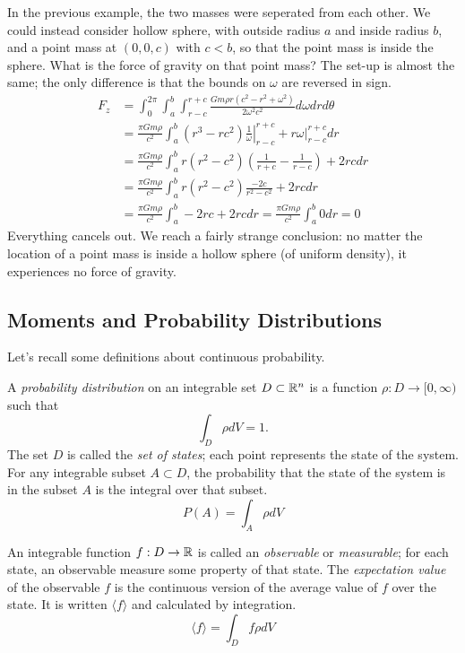 \documentclass[fleqn,letterpaper]{report}
\begin{document}
In the previous example, the two masses were seperated from
each other. We could instead consider hollow sphere, with outside radius
$a$ and inside radius $b$, and a point mass at $(0,0,c)$ with
$c<b$, so that the point mass is inside the sphere. What is
the force of gravity on that point mass? The set-up is 
almost the same; the only difference is that the bounds on
$\omega$ are reversed in sign.
\begin{align*}
F_z & = \int_0^{2\pi} \int_a^b \int_{r-c}^{r+c} \frac{Gm\rho r
(c^2 -r^2 + \omega^2)}{2\omega^2 c^2} d\omega dr d\theta \\
& = \frac{\pi G m \rho}{c^2} \int_a^b \left. (r^3-rc^2)
\frac{1}{\omega} \right|_{r-c}^{r+c} + r\omega
\bigg|_{r-c}^{r+c} dr \\
& = \frac{\pi G m \rho}{c^2} \int_a^b r(r^2 -c^2) \left(
\frac{1}{r+c} - \frac{1}{r-c} \right) + 2rc dr \\
& = \frac{\pi G m \rho}{c^2} \int_a^b r(r^2 -c^2)
\frac{-2c}{r^2-c^2} + 2rc dr \\
& = \frac{\pi G m \rho}{c^2} \int_a^b -2rc + 2rc dr =
\frac{\pi G m \rho}{c^2} \int_a^b 0 dr = 0
\end{align*}
Everything cancels out. We reach a fairly strange conclusion:
no matter the location of a point mass is inside a hollow
sphere (of uniform density), it experiences no force of
gravity.

\subsection{Moments and Probability Distributions}
\label{moments}

Let's recall some definitions about continuous probability. 

\begin{defn}
A \emph{probability distribution} on an integrable set $D
\subset \mathbb{R}^n$ is a function $\rho: D \rightarrow [0, \infty)$
such that 
\begin{equation*}
\int_D \rho dV = 1.
\end{equation*}
The set $D$ is called the \emph{set of states}; each point represents
the state of the system. For any integrable subset $A \subset D$, the
probability that the state of the system is in the subset $A$
is the integral over that subset.
\begin{equation*}
P(A) = \int_A \rho dV 
\end{equation*}
\end{defn}

\begin{defn}
An integrable function $f: D \rightarrow \mathbb{R}$ is called an
\emph{observable} or \emph{measurable}; for each state, an
observable measure some property of that state. The
\emph{expectation value} of the observable $f$ is the continuous
version of the average value of $f$ over the state. It is
written $\langle f\rangle$ and calculated by integration.
\begin{equation*}
\langle f\rangle = \int_D f \rho dV
\end{equation*}
\end{defn}
\end{document}
